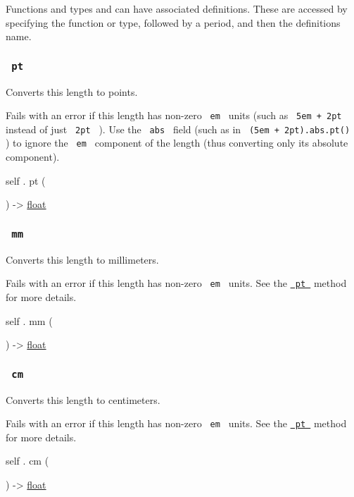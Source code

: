 \label{definitions-tooltip}
Functions and types and can have associated definitions. These are
accessed by specifying the function or type, followed by a period, and
then the definition\textquotesingle s name.

\subsubsection{\texorpdfstring{\texttt{\ pt\ }}{ pt }}\label{definitions-pt}

Converts this length to points.

Fails with an error if this length has non-zero \texttt{\ em\ } units
(such as \texttt{\ 5em\ +\ 2pt\ } instead of just \texttt{\ 2pt\ } ).
Use the \texttt{\ abs\ } field (such as in
\texttt{\ (5em\ +\ 2pt).abs.pt()\ } ) to ignore the \texttt{\ em\ }
component of the length (thus converting only its absolute component).

self { . } { pt } (

) -\textgreater{} \href{/docs/reference/foundations/float/}{float}

\subsubsection{\texorpdfstring{\texttt{\ mm\ }}{ mm }}\label{definitions-mm}

Converts this length to millimeters.

Fails with an error if this length has non-zero \texttt{\ em\ } units.
See the
\href{/docs/reference/layout/length/\#definitions-pt}{\texttt{\ pt\ }}
method for more details.

self { . } { mm } (

) -\textgreater{} \href{/docs/reference/foundations/float/}{float}

\subsubsection{\texorpdfstring{\texttt{\ cm\ }}{ cm }}\label{definitions-cm}

Converts this length to centimeters.

Fails with an error if this length has non-zero \texttt{\ em\ } units.
See the
\href{/docs/reference/layout/length/\#definitions-pt}{\texttt{\ pt\ }}
method for more details.

self { . } { cm } (

) -\textgreater{} \href{/docs/reference/foundations/float/}{float}

